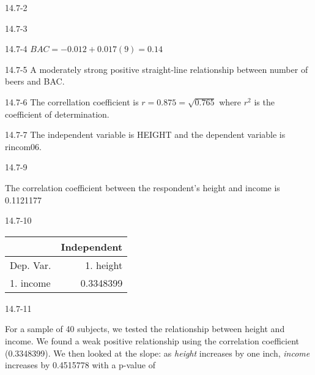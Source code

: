 \begin{exsol@solution}{14.7-2}
\end{exsol@solution}
\begin{exsol@solution}{14.7-3}

\end{exsol@solution}
\begin{exsol@solution}{14.7-4}
     $ BAC = -0.012 + 0.017 (9) = 0.14 $
\end{exsol@solution}
\begin{exsol@solution}{14.7-5}
    A moderately strong positive straight-line relationship between number of beers and BAC.
\end{exsol@solution}
\begin{exsol@solution}{14.7-6}
       The correllation coefficient is $r = 0.875 = \sqrt{0.765}$ where  $r^2$ is the coefficient of determination.
\end{exsol@solution}
\begin{exsol@solution}{14.7-7}
       The independent variable is HEIGHT and the dependent variable is rincom06.
\end{exsol@solution}
\begin{exsol@solution}{14.7-9}

       The correlation coefficient between the respondent's height and income is 0.1121177

\end{exsol@solution}
\begin{exsol@solution}{14.7-10}

       \begin{table}[ht]
    \centering
    \begin{tabular}{lr} \hline
        &  \multicolumn{1}{c}{Independent} \\ \hline

    Dep. Var. & 1. height      \\ \hline
    1. income  &   0.3348399      \\ \hline

    \end{tabular}
    \end{table}


\end{exsol@solution}
\begin{exsol@solution}{14.7-11}

    For a sample of 40 subjects, we tested the relationship between height and income.  We found a weak positive relationship using the correlation coefficient (0.3348399).  We then looked at the slope:  as {\textit{height}} increases by one inch, {\textit{income}} increases by 0.4515778 with a p-value of


\end{exsol@solution}
